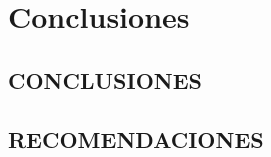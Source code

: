 \chapter{Conclusiones}\label{chp-conclusiones}
\section{CONCLUSIONES}

\section{RECOMENDACIONES}








